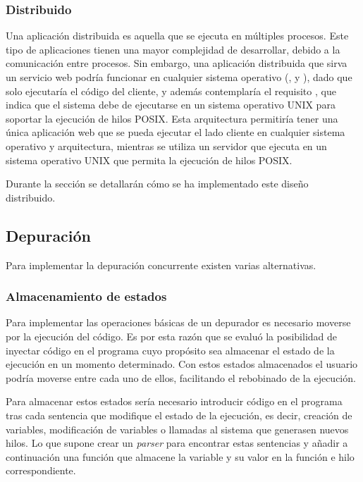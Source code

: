 \subsubsection{Distribuido} \label{subsubsec:distribuido}

Una aplicación distribuida es aquella que se ejecuta en múltiples procesos. Este tipo de aplicaciones tienen una mayor complejidad de desarrollar, debido a la comunicación entre procesos. Sin embargo, una aplicación distribuida que sirva un servicio web podría funcionar en cualquier sistema operativo (,  y ), dado que solo ejecutaría el código del cliente, y además contemplaría el requisito , que indica que el sistema debe de ejecutarse en un sistema operativo UNIX para soportar la ejecución de hilos POSIX. Esta arquitectura permitiría tener una única aplicación web que se pueda ejecutar el lado cliente en cualquier sistema operativo y arquitectura, mientras se utiliza un servidor que ejecuta en un sistema operativo UNIX que permita la ejecución de hilos POSIX.

Durante la sección  se detallarán cómo se ha implementado este diseño distribuido. 

\subsection{Depuración} \label{subsec:depuracion}

Para implementar la depuración concurrente existen varias alternativas. 

\subsubsection{Almacenamiento de estados} \label{subsec:almacenamiento-estados}

Para implementar las operaciones básicas de un depurador es necesario moverse por la ejecución del código. Es por esta razón que se evaluó la posibilidad de inyectar código en el programa cuyo propósito sea almacenar el estado de la ejecución en un momento determinado. Con estos estados almacenados el usuario podría moverse entre cada uno de ellos, facilitando el rebobinado de la ejecución.

Para almacenar estos estados sería necesario introducir código en el programa tras cada sentencia que modifique el estado de la ejecución, es decir, creación de variables, modificación de variables o llamadas al sistema que generasen nuevos hilos. Lo que supone crear un \textit{\gls{parser}} para encontrar estas sentencias y añadir a continuación una función que almacene la variable y su valor en la función e hilo correspondiente. 

